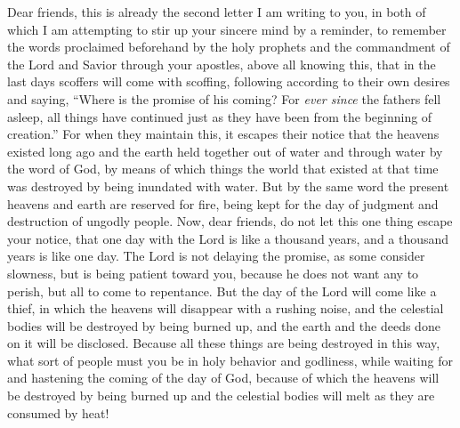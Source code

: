 \begin{biblechapter} %
 Dear friends, this is already the second letter I am writing to you, in both of which I am attempting to stir up your sincere mind by a reminder,
\verse to remember the words proclaimed beforehand by the holy prophets and the commandment of the Lord and Savior through your apostles,
\verse above all knowing this, that in the last days scoffers will come with scoffing, following according to their own desires
\verse and saying, “Where is the promise of his coming? For \textit{ever since} the fathers fell asleep, all things have continued just as they have been from the beginning of creation.”
\verse For when they maintain this, it escapes their notice that the heavens existed long ago and the earth held together out of water and through water by the word of God,
\verse by means of which things the world that existed at that time was destroyed by being inundated with water.
\verse But by the same word the present heavens and earth are reserved for fire, being kept for the day of judgment and destruction of ungodly people.
\verse Now, dear friends, do not let this one thing escape your notice, that one day with the Lord is like a thousand years, and a thousand years is like one day.
\verse The Lord is not delaying the promise, as some consider slowness, but is being patient toward you, because he does not want any to perish, but all to come to repentance.
\verse But the day of the Lord will come like a thief, in which the heavens will disappear with a rushing noise, and the celestial bodies will be destroyed by being burned up, and the earth and the deeds done on it will be disclosed.
\verse Because all these things are being destroyed in this way, what sort of people must you be in holy behavior and godliness,
\verse while waiting for and hastening the coming of the day of God, because of which the heavens will be destroyed by being burned up and the celestial bodies will melt as they are consumed by heat!

\end{biblechapter}
